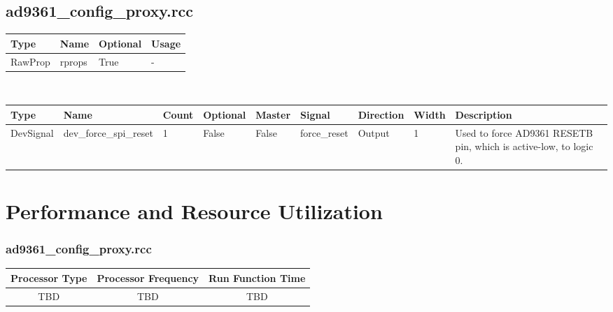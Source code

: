 \documentclass{article}
\def\comp{ad9361\_config\_proxy}
\begin{document}
\begin{landscape}
	\subsection*{\comp.rcc}
	\begin{scriptsize}
		\begin{tabular}{|p{2cm}|p{1.5cm}|p{1.5cm}|p{15.74cm}|}
			\hline
			\rowcolor{blue}
			Type            & Name & Optional & Usage                  \\
			\hline
			RawProp & rprops  & True & - \\
			\hline
		\end{tabular}
	\end{scriptsize} \\
	\begin{scriptsize}
		\begin{tabular}{|p{1.5cm}|p{2.4cm}|p{1.05cm}|p{1.25cm}|p{1.2cm}|p{2cm}|p{1.4cm}|p{0.9cm}|p{6.88cm}|}
			\hline
			\rowcolor{blue}
			Type                       & Name                            & Count & Optional & Master                & Signal                & Direction                  & Width                    & Description                                                                                                                  \\
			\hline
			DevSignal & dev\_force\_spi\_reset & 1 & False & False & force\_reset & Output & 1 & Used to force AD9361 RESETB pin, which is active-low, to logic 0. \\
			\hline
		\end{tabular}
	\end{scriptsize}
\end{landscape}

\section*{Performance and Resource Utilization}
\subsubsection*{\comp.rcc}
\begin{scriptsize}
        \begin{tabular}{|c|c|c|}
                \hline
                \rowcolor{blue}
                Processor Type & Processor Frequency & Run Function Time \\
                \hline
                TBD            & TBD                 & TBD               \\
                \hline
        \end{tabular}
\end{scriptsize}
\end{document}

